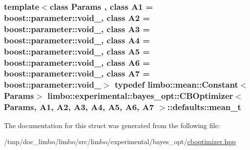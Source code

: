 \subsubsection[{mean\+\_\+t}]{\setlength{\rightskip}{0pt plus 5cm}template$<$class Params , class A1  = boost\+::parameter\+::void\+\_\+, class A2  = boost\+::parameter\+::void\+\_\+, class A3  = boost\+::parameter\+::void\+\_\+, class A4  = boost\+::parameter\+::void\+\_\+, class A5  = boost\+::parameter\+::void\+\_\+, class A6  = boost\+::parameter\+::void\+\_\+, class A7  = boost\+::parameter\+::void\+\_\+$>$ typedef {\bf limbo\+::mean\+::\+Constant}$<$Params$>$ {\bf limbo\+::experimental\+::bayes\+\_\+opt\+::\+C\+B\+Optimizer}$<$ Params, A1, A2, A3, A4, A5, A6, A7 $>$\+::{\bf defaults\+::mean\+\_\+t}}\label{structlimbo_1_1experimental_1_1bayes__opt_1_1_c_b_optimizer_1_1defaults_a6f42eec8660a35b4f1eb066af0c1b2b9}


The documentation for this struct was generated from the following file\+:\begin{DoxyCompactItemize}
\item 
/tmp/doc\+\_\+limbo/limbo/src/limbo/experimental/bayes\+\_\+opt/\hyperlink{cboptimizer_8hpp}{cboptimizer.\+hpp}\end{DoxyCompactItemize}
